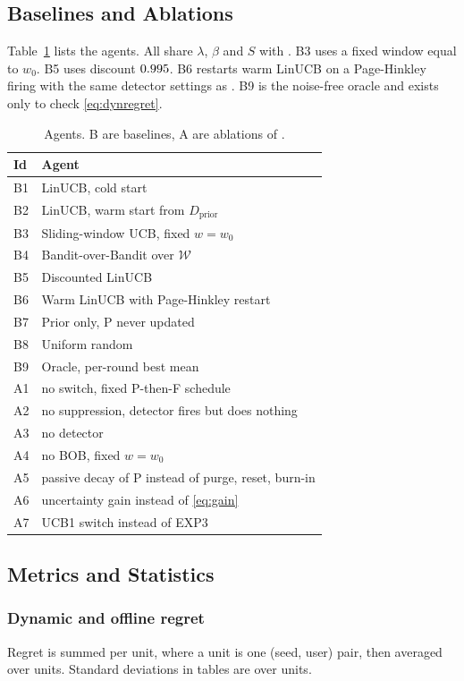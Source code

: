 \subsection{Baselines and Ablations}
Table~\ref{tab:agents} lists the agents. All share $\lambda$, $\beta$ and $S$ with \des{}. B3 uses a fixed window equal to $w_0$. B5 uses discount $0.995$. B6 restarts warm LinUCB on a Page-Hinkley firing with the same detector settings as \des{}. B9 is the noise-free oracle and exists only to check \eqref{eq:dynregret}.

\begin{table}[t]
\centering
\caption{Agents. B are baselines, A are ablations of \des{}.}
\label{tab:agents}
\small
\begin{tabular}{ll}
\toprule
Id & Agent \\
\midrule
B1 & LinUCB, cold start \cite{li2010} \\
B2 & LinUCB, warm start from $D_{\mathrm{prior}}$ \\
B3 & Sliding-window UCB, fixed $w=w_0$ \cite{garivier2011} \\
B4 & Bandit-over-Bandit over $\mathcal W$ \cite{cheung2019} \\
B5 & Discounted LinUCB \cite{russac2019} \\
B6 & Warm LinUCB with Page-Hinkley restart \cite{liu2018} \\
B7 & Prior only, P never updated \\
B8 & Uniform random \\
B9 & Oracle, per-round best mean \\
\midrule
A1 & no switch, fixed P-then-F schedule \\
A2 & no suppression, detector fires but does nothing \\
A3 & no detector \\
A4 & no BOB, fixed $w=w_0$ \\
A5 & passive decay of P instead of purge, reset, burn-in \\
A6 & uncertainty gain instead of \eqref{eq:gain} \\
A7 & UCB1 switch instead of EXP3 \\
\bottomrule
\end{tabular}
\end{table}

\subsection{Metrics and Statistics}
\subsubsection*{Dynamic and offline regret}
Regret is summed per unit, where a unit is one (seed, user) pair, then averaged over units. Standard deviations in tables are over units.

